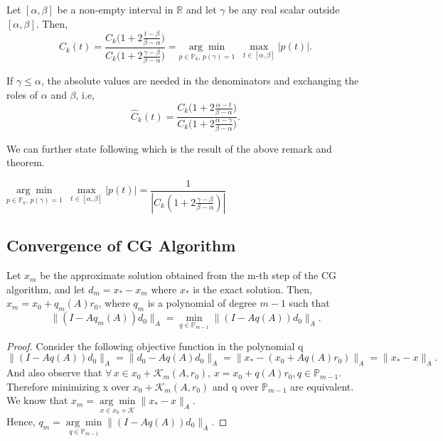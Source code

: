 \documentclass[10pt,a4paper]{article}
\begin{document}
\begin{theorem}
Let $[\alpha,\beta]$ be a non-empty interval in $\mathbb{R}$ and let $\gamma$ be any real scalar outside $[\alpha,\beta].$ Then,
$$\hat{C}_k(t)=\frac{C_k\Big(1+2\frac{t-\beta}{\beta-\alpha}\Big)}{C_k\Big(1+2\frac{\gamma-\beta}{\beta-\alpha}\Big)}=\underset{p\in\mathbb{P}_k,\,p(\gamma)=1}{\arg\min}\;\;\underset{t\in[\alpha,\beta]}{\max}|p(t)|.$$
\end{theorem}

\begin{remark}
If $\gamma\le\alpha$, the absolute values are needed in the denominators and exchanging the roles of $\alpha$ and $\beta$, i.e,
$$\hat{C}_k(t)=\frac{C_k\Big(1+2\frac{\alpha-t}{\beta-\alpha}\Big)}{C_k\Big(1+2\frac{\alpha-\gamma}{\beta-\alpha}\Big)}.$$
\end{remark}

We can further state following which is the result of the above remark and theorem.

\begin{corollary}
$\underset{p\in\mathbb{P}_k,\,p(\gamma)=1}{\arg\min}\;\;\underset{t\in[\alpha,\beta]}{\max}|p(t)| = \dfrac{1}{|C_k(1+2\frac{\gamma-\beta}{\beta-\alpha})|}$
\end{corollary}

\subsection{Convergence of CG Algorithm}

\begin{lemma}
Let $x_m$ be the approximate solution obtained from the m-th step of the CG algorithm, and let $d_m=x_*-x_m$ where $x_*$ is the exact solution. Then, $x_m=x_0+q_m(A)r_0$, where $q_m$ is a polynomial of degree $m-1$ such that
$$\|(I-Aq_m(A))d_0\|_A = \underset{q\in \mathbb{P}_{m-1}}{\min}\|(I-Aq(A))d_0\|_A.$$
\end{lemma}

\begin{proof}
Consider the following objective function in the polynomial q
$$\|(I-Aq(A))d_0\|_A = \|d_0-Aq(A)d_0\|_A = \|x_*-(x_0+Aq(A)r_0)\|_A = \|x_*-x\|_A.$$
And also observe that $\forall\,x\in x_0+\mathcal{K}_m(A,r_0),\,x=x_0+q(A)r_0,q\in\mathbb{P}_{m-1}$. Therefore minimizing x over $x_0+\mathcal{K}_m(A,r_0)$ and q over $\mathbb{P}_{m-1}$ are equivalent. We know that $x_m = \underset{x\in x_0+\mathcal{K}}{\arg\min}\|x_*-x\|_A$. $\text{Hence, }q_m=\underset{q\in \mathbb{P}_{m-1}}{\arg\min}\|(I-Aq(A))d_0\|_A.$
\end{proof}
\end{document}
